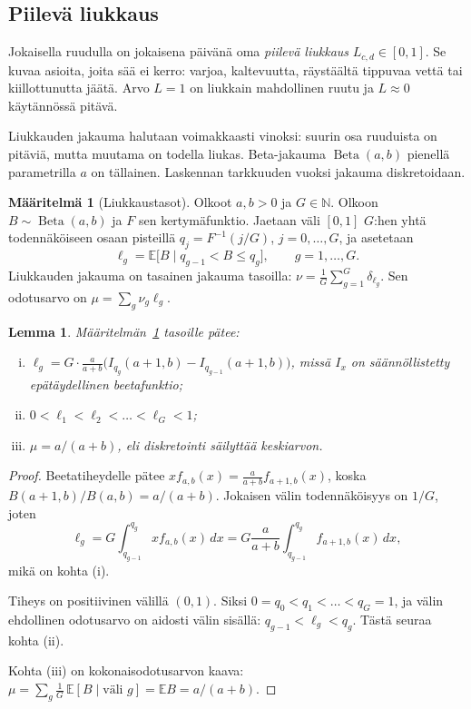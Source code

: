 \documentclass[11pt,a4paper]{article}
\theoremstyle{plain}
\newtheorem{lemma}{Lemma}
\theoremstyle{definition}
\newtheorem{maaritelma}{Määritelmä}
\theoremstyle{remark}
\newcommand{\E}{\mathbb{E}}
\newcommand{\1}{\mathbf{1}}
\newcommand{\Beta}{\operatorname{Beta}}
\begin{document}
\subsection{Piilevä liukkaus}

Jokaisella ruudulla on jokaisena päivänä oma \emph{piilevä liukkaus}
$L_{c,d} \in [0,1]$. Se kuvaa asioita, joita sää ei kerro: varjoa, kaltevuutta,
räystäältä tippuvaa vettä tai kiillottunutta jäätä. Arvo $L = 1$ on liukkain
mahdollinen ruutu ja $L \approx 0$ käytännössä pitävä.

Liukkauden jakauma halutaan voimakkaasti vinoksi: suurin osa ruuduista on
pitäviä, mutta muutama on todella liukas. Beta-jakauma $\Beta(a,b)$ pienellä
parametrilla $a$ on tällainen. Laskennan tarkkuuden vuoksi jakauma
diskretoidaan.

\begin{maaritelma}[Liukkaustasot]\label{maar:tasot}
Olkoot $a, b > 0$ ja $G \in \mathbb{N}$. Olkoon $B \sim \Beta(a,b)$ ja $F$ sen
kertymäfunktio. Jaetaan väli $[0,1]$ $G$:hen yhtä todennäköiseen osaan
pisteillä $q_j = F^{-1}(j/G)$, $j = 0, \dots, G$, ja asetetaan
\[
  \ell_g = \E\bigl[B \mid q_{g-1} < B \le q_g\bigr], \qquad g = 1, \dots, G.
\]
Liukkauden jakauma on tasainen jakauma tasoilla:
$\nu = \frac{1}{G} \sum_{g=1}^{G} \delta_{\ell_g}$. Sen odotusarvo on
$\mu = \sum_g \nu_g \ell_g$.
\end{maaritelma}

\begin{lemma}\label{le:tasot}
Määritelmän~\ref{maar:tasot} tasoille pätee:
\begin{enumerate}[(i)]
  \item $\ell_g = G \cdot \frac{a}{a+b} \bigl(I_{q_g}(a+1, b) - I_{q_{g-1}}(a+1, b)\bigr)$,
  missä $I_x$ on säännöllistetty epätäydellinen beetafunktio;
  \item $0 < \ell_1 < \ell_2 < \dots < \ell_G < 1$;
  \item $\mu = a/(a+b)$, eli diskretointi säilyttää keskiarvon.
\end{enumerate}
\end{lemma}

\begin{proof}
Beetatiheydelle pätee $x f_{a,b}(x) = \frac{a}{a+b} f_{a+1,b}(x)$, koska
$B(a+1,b)/B(a,b) = a/(a+b)$. Jokaisen välin todennäköisyys on $1/G$, joten
\[
  \ell_g = G \int_{q_{g-1}}^{q_g} x f_{a,b}(x)\,dx
         = G \frac{a}{a+b} \int_{q_{g-1}}^{q_g} f_{a+1,b}(x)\,dx,
\]
mikä on kohta (i).

Tiheys on positiivinen välillä $(0,1)$. Siksi $0 = q_0 < q_1 < \dots < q_G = 1$,
ja välin ehdollinen odotusarvo on aidosti välin sisällä:
$q_{g-1} < \ell_g < q_g$. Tästä seuraa kohta (ii).

Kohta (iii) on kokonaisodotusarvon kaava:
$\mu = \sum_g \frac{1}{G}\, \E[B \mid \text{väli } g] = \E B = a/(a+b)$.
\end{proof}
\end{document}
